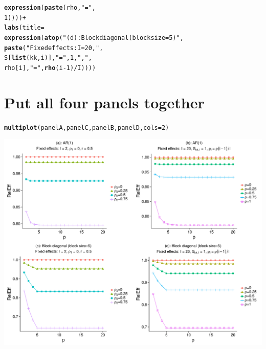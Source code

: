 \documentclass{article}\usepackage[]{graphicx}\usepackage[]{color}
\makeatletter
\def\maxwidth{ %
  \ifdim\Gin@nat@width>\linewidth
    \linewidth
  \else
    \Gin@nat@width
  \fi
}
\newcommand{\hlnum}[1]{\textcolor[rgb]{0.686,0.059,0.569}{#1}}%
\newcommand{\hlstr}[1]{\textcolor[rgb]{0.192,0.494,0.8}{#1}}%
\newcommand{\hlopt}[1]{\textcolor[rgb]{0,0,0}{#1}}%
\newcommand{\hlstd}[1]{\textcolor[rgb]{0.345,0.345,0.345}{#1}}%
\newcommand{\hlkwc}[1]{\textcolor[rgb]{0.333,0.667,0.333}{#1}}%
\newcommand{\hlkwd}[1]{\textcolor[rgb]{0.737,0.353,0.396}{\textbf{#1}}}%
\newenvironment{kframe}{%
 \def\at@end@of@kframe{}%
 \ifinner\ifhmode%
  \def\at@end@of@kframe{\end{minipage}}%
  \begin{minipage}{\columnwidth}%
 \fi\fi%
 \def\FrameCommand##1{\hskip\@totalleftmargin \hskip-\fboxsep
 \colorbox{shadecolor}{##1}\hskip-\fboxsep
     \hskip-\linewidth \hskip-\@totalleftmargin \hskip\columnwidth}%
 \MakeFramed {\advance\hsize-\width
   \@totalleftmargin\z@ \linewidth\hsize
   \@setminipage}}%
 {\par\unskip\endMakeFramed%
 \at@end@of@kframe}
\newenvironment{knitrout}{}{} %
\makeatother
\begin{document}
\begin{knitrout}
\begin{kframe}
\begin{alltt}
                           \hlkwd{expression}\hlstd{(}\hlkwd{paste}\hlstd{(rho,} \hlstr{"="}\hlstd{,}
                                            \hlnum{1}\hlstd{))))} \hlopt{+}
  \hlkwd{labs}\hlstd{(}\hlkwc{title}\hlstd{=}
         \hlkwd{expression}\hlstd{(}\hlkwd{atop}\hlstd{(}\hlstr{"(d): Block diagonal (block size=5)"}\hlstd{,}
                         \hlkwd{paste}\hlstd{(}\hlstr{"Fixed effects: I = 20, "}\hlstd{,}
                               \hlstd{S[}\hlkwd{list}\hlstd{(kk,i)],} \hlstr{" = "}\hlstd{,} \hlnum{1}\hlstd{,} \hlstr{", "}\hlstd{,}
                               \hlstd{rho[i],} \hlstr{" = "}\hlstd{,} \hlkwd{rho}\hlstd{(i}\hlopt{-}\hlnum{1}\hlstd{)}\hlopt{/}\hlstd{I))))}
\end{alltt}
\end{kframe}
\end{knitrout}

\section{Put all four panels together}

\begin{knitrout}
\color{fgcolor}\begin{kframe}
\begin{alltt}
\hlkwd{multiplot}\hlstd{(panelA, panelC, panelB, panelD,} \hlkwc{cols}\hlstd{=}\hlnum{2}\hlstd{)}
\end{alltt}


{\ttfamily\noindent\itshape\color{messagecolor}{\#\# Loading required package: grid}}\end{kframe}

{\centering \includegraphics[width=\maxwidth]{figures/Figure_S3_panels_abcd-1} 

}



\end{knitrout}
\end{document}
